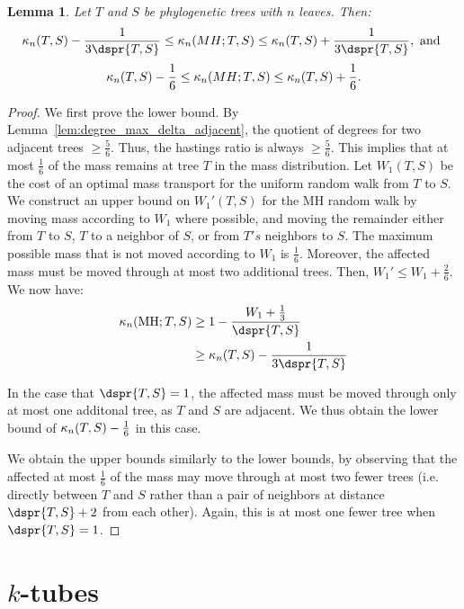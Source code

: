 \documentclass{amsart}
\newtheorem{lemma}[theorem]{Lemma}
\newcommand{\curvature}[2][]{%
    \ifthenelse{\equal{#1}{}}%
		{\kappa_n(#2)}%
		{\kappa_n(#1;#2)}%
}
\begin{document}
\begin{lemma}
	Let $T$ and $S$ be phylogenetic trees with $n$ leaves. Then:
	$$\curvature{T,S} - \frac{1}{3\dspr{T,S}}
	\le \curvature[MH]{T,S}
	\le \curvature{T,S} + \frac{1}{3\dspr{T,S}}, \text{ and }$$
	$$\curvature{T,S} - \frac{1}{6}
	\le \curvature[MH]{T,S}
	\le \curvature{T,S} + \frac{1}{6}.$$
\end{lemma}
\begin{proof}
	We first prove the lower bound.
	By Lemma~\ref{lem:degree_max_delta_adjacent}, the quotient of degrees for two adjacent trees $\ge \frac{5}{6}$.
	Thus, the hastings ratio is always $\ge \frac{5}{6}$.
	This implies that at most $\frac{1}{6}$ of the mass remains at tree $T$ in the mass distribution.
	Let $W_1(T,S)$ be the cost of an optimal mass transport for the uniform random walk from $T$ to $S$.
	We construct an upper bound on $W_1'(T,S)$ for the MH random walk by moving mass according to $W_1$ where possible, and moving the remainder either from $T$ to $S$, $T$ to a neighbor of $S$, or from $T's$ neighbors to $S$.
	The maximum possible mass that is not moved according to $W_1$ is $\frac{1}{6}$.
	Moreover, the affected mass must be moved through at most two additional trees.
	Then, $W_1' \le W_1 + \frac{2}{6}$.
	We now have:
	\begin{align*}
		\curvature[\mathrm{MH}]{T,S} & \ge 1 - \frac{W_1 + \frac{1}{3}}{\dspr{T,S}} \\
		& \ge \curvature{T,S} - \frac{1}{3\dspr{T,S}}
	\end{align*}

	In the case that $\dspr{T,S}=1$, the affected mass must be moved through only at most one additonal tree, as $T$ and $S$ are adjacent.
	We thus obtain the lower bound of $\curvature{T,S} - \frac{1}{6}$ in this case.

	We obtain the upper bounds similarly to the lower bounds, by observing that the affected at most $\frac{1}{6}$ of the mass may move through at most two fewer trees (i.e. directly between $T$ and $S$ rather than a pair of neighbors at distance $\dspr{T,S} + 2$ from each other).
	Again, this is at most one fewer tree when $\dspr{T,S}=1$.

\end{proof}











\section{$k$-tubes}
\end{document}

